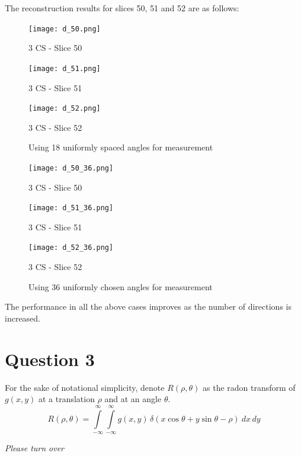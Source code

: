 \documentclass[12pt]{article}
\begin{document}
The reconstruction results for slices 50, 51 and 52 are as follows:
\begin{figure}[ht]
	\centering
	\begin{minipage}[bt]{0.3\linewidth}
		\centering
		\texttt{[image: d\_50.png]}
		\caption*{3 CS - Slice 50}
	\end{minipage}
	\begin{minipage}[bt]{0.3\linewidth}
		\centering
		\texttt{[image: d\_51.png]}
		\caption*{3 CS - Slice 51}
	\end{minipage}
	\begin{minipage}[bt]{0.3\linewidth}
		\centering
		\texttt{[image: d\_52.png]}
		\caption*{3 CS - Slice 52}
	\end{minipage}
\caption{Using 18 uniformly spaced angles for measurement}
\end{figure}
\begin{figure}[ht]
	\centering
	\begin{minipage}[bt]{0.3\linewidth}
		\centering
		\texttt{[image: d\_50\_36.png]}
		\caption*{3 CS - Slice 50}
	\end{minipage}
	\begin{minipage}[bt]{0.3\linewidth}
		\centering
		\texttt{[image: d\_51\_36.png]}
		\caption*{3 CS - Slice 51}
	\end{minipage}
	\begin{minipage}[bt]{0.3\linewidth}
		\centering
		\texttt{[image: d\_52\_36.png]}
		\caption*{3 CS - Slice 52}
	\end{minipage}
	\caption{Using 36 uniformly chosen angles for measurement}
\end{figure}
\newpage
The performance in all the above cases improves as the number of directions is increased.
\section*{Question 3}
For the sake of notational simplicity, denote $R(\rho, \theta)$ as the radon transform of $g(x, y)$ at a translation $\rho$ and at an angle $\theta$.
$$R(\rho, \theta) = \int\limits_{-\infty}^\infty \int \limits_{-\infty}^\infty g(x, y) \, \delta(x \cos\theta  + y \sin \theta - \rho)\: dx\,dy$$
\vspace{1.5cm}
\begin{center}
\textit{Please turn over}
\end{center}
\newpage
\end{document}

